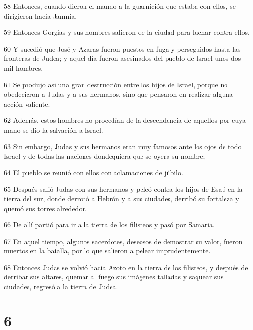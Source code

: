 \par 58 Entonces, cuando dieron el mando a la guarnición que estaba con ellos, se dirigieron hacia Jamnia.
\par 59 Entonces Gorgias y sus hombres salieron de la ciudad para luchar contra ellos.
\par 60 Y sucedió que José y Azaras fueron puestos en fuga y perseguidos hasta las fronteras de Judea; y aquel día fueron asesinados del pueblo de Israel unos dos mil hombres.
\par 61 Se produjo así una gran destrucción entre los hijos de Israel, porque no obedecieron a Judas y a sus hermanos, sino que pensaron en realizar alguna acción valiente.
\par 62 Además, estos hombres no procedían de la descendencia de aquellos por cuya mano se dio la salvación a Israel.
\par 63 Sin embargo, Judas y sus hermanos eran muy famosos ante los ojos de todo Israel y de todas las naciones dondequiera que se oyera su nombre;
\par 64 El pueblo se reunió con ellos con aclamaciones de júbilo.
\par 65 Después salió Judas con sus hermanos y peleó contra los hijos de Esaú en la tierra del sur, donde derrotó a Hebrón y a sus ciudades, derribó su fortaleza y quemó sus torres alrededor.
\par 66 De allí partió para ir a la tierra de los filisteos y pasó por Samaria.
\par 67 En aquel tiempo, algunos sacerdotes, deseosos de demostrar su valor, fueron muertos en la batalla, por lo que salieron a pelear imprudentemente.
\par 68 Entonces Judas se volvió hacia Azoto en la tierra de los filisteos, y después de derribar sus altares, quemar al fuego sus imágenes talladas y saquear sus ciudades, regresó a la tierra de Judea.

\chapter{6}

